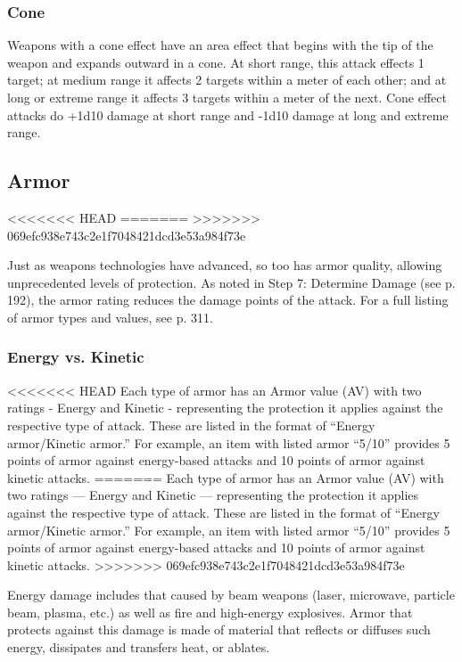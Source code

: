 \subsubsection{Cone}

Weapons with a cone effect have an area effect that begins with the tip of the weapon and expands outward in a cone. At short range, this attack effects 1 target; at medium range it affects 2 targets within a meter of each other; and at long or extreme range it affects 3 targets within a meter of the next. Cone effect attacks do +1d10 damage at short range and -1d10 damage at long and extreme range.


\subsection{Armor}
<<<<<<< HEAD
\label{sec:armor}
=======
\label{sec:combat-armor}
>>>>>>> 069efc938e743c2e1f7048421dcd3e53a984f73e

Just as weapons technologies have advanced, so too has armor quality, allowing unprecedented levels of protection. As noted in Step 7: Determine Damage (see p. 192), the armor rating reduces the damage points of the attack. For a full listing of armor types and values, see p. 311.

\subsubsection{Energy vs. Kinetic}

<<<<<<< HEAD
Each type of armor has an Armor value (AV) with two ratings - Energy and Kinetic - representing the protection it applies against the respective type of attack. These are listed in the format of ``Energy armor/Kinetic armor.'' For example, an item with listed armor ``5/10'' provides 5 points of armor against energy-based attacks and 10 points of armor against kinetic attacks.
=======
Each type of armor has an Armor value (AV) with two ratings --- Energy and Kinetic --- representing the protection it applies against the respective type of attack. These are listed in the format of ``Energy armor/Kinetic armor.'' For example, an item with listed armor ``5/10'' provides 5 points of armor against energy-based attacks and 10 points of armor against kinetic attacks.
>>>>>>> 069efc938e743c2e1f7048421dcd3e53a984f73e

Energy damage includes that caused by beam weapons (laser, microwave, particle beam, plasma, etc.) as well as fire and high-energy explosives. Armor that protects against this damage is made of material that reflects or diffuses such energy, dissipates and transfers heat, or ablates.

